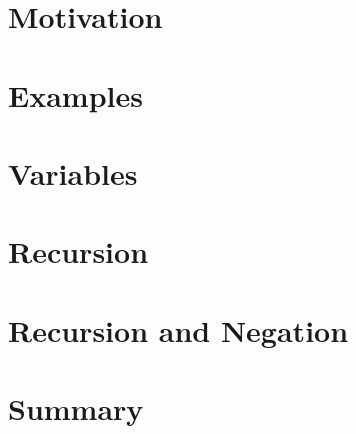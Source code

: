 \newcommand{\myinput}[1]{
\ifx\inlibrary\undefined
  
\else
  
\fi
}

\myinput{ezasp/macros}
\myinput{ezasp/summary}
\section{Motivation}
\section{Examples}
\section{Variables}
\section{Recursion}
\section{Recursion and Negation}
\section{Summary}
%
%
%
%

